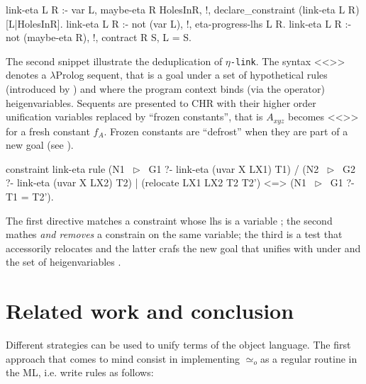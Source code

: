 \documentclass[sigconf,natbib=false,review]{acmart}
\def\elpi{\proglang{elpi}}
\newcommand{\UnifRel}{\ensuremath{\simeq}}
\newcommand{\Uo}{\texorpdfstring{\ensuremath{\UnifRel_o}\xspace}{unif\_o}}
\newcommand{\linkMacro}[1]{\ensuremath{#1}\texttt{-link}\xspace}
\newcommand{\linketa} {\linkMacro{\eta}}
\newcommand{\lhs}{lhs\xspace}
\begin{document}
\begin{elpicode}
link-eta L R :- var L, maybe-eta R HolesInR, !,
  declare_constraint (link-eta L R) [L|HolesInR].
link-eta L R :- not (var L), !, eta-progress-lhs L R.
link-eta L R :- not (maybe-eta R), !, contract R S, L = S.
\end{elpicode}

\noindent
The second snippet illustrate the deduplication of \linketa. The syntax
<<>> denotes a $\lambda$Prolog sequent, that is a 
goal  under a set  of hypothetical rules (introduced
by \elpiIn{=>}) and where the program context binds (via the 
operator) \elpi{N} heigenvariables. Sequents are presented to
CHR with their higher order unification variables replaced by
``frozen constants'', that is $A_{xyz}$ becomes <<>>
for a fresh constant $f_A$. Frozen constants are ``defrost'' when
they are part of a new goal (see \cite[section 4.3]{TASSI_2019}).

\begin{elpicode}
constraint link-eta {
  rule (N1 ~$\triangleright$~ G1 ?- link-eta (uvar X LX1) T1)   %
    /  (N2 ~$\triangleright$~ G2 ?- link-eta (uvar X LX2) T2)   %
    |  (relocate LX1 LX2 T2 T2')               %
   <=> (N1 ~$\triangleright$~ G1 ?- T1 = T2').                } %
\end{elpicode}

\noindent
The first directive matches a constraint
whose \lhs is a variable ; the second mathes \emph{and removes}
a constrain on the same variable; the third is a test that accessorily
relocates  and the latter crafs the new goal that unifies
 with  under  and the set of
heigenvariables .


\noindent
\section{Related work and conclusion}

Different strategies can be used to unify terms of the object language.
The first approach that comes to mind consist in implementing \Uo as a
regular routine in the ML, i.e. write rules as follows:
\end{document}
